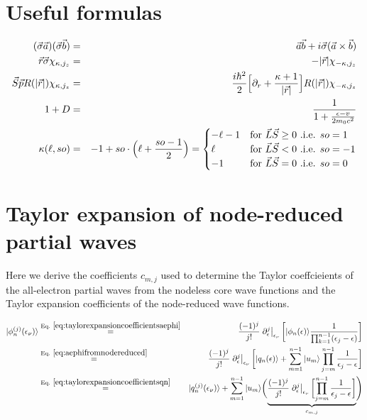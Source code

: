 \documentclass[11pt,a4paper]{report}
\begin{document}
\chapter{Useful formulas}
\begin{eqnarray}
(\vec{\sigma}\vec{a})(\vec{\sigma}\vec{b})
&=&\vec{a}\vec{b}+i\vec{\sigma}(\vec{a}\times\vec{b})
\\
\vec{r}\vec{\sigma}\chi_{\kappa,j_z}&=&-|\vec{r}|\chi_{-\kappa,j_z}
\\
\vec{S}\vec{p}R(|\vec{r}|)\chi_{\kappa,j_z}
&=&\frac{i\hbar^2}{2}\Bigl[\partial_r+\frac{\kappa+1}{|\vec{r}|}\Bigr]
R(|\vec{r}|)\chi_{-\kappa,j_z}
\\
1+D&=&\frac{1}{1+\frac{\epsilon-v}{2m_0c^2}}
\\
\kappa(\ell,so)&=&-1+so\cdot\Bigl(\ell+\frac{so-1}{2}\Bigr)
=
\begin{cases}
-\ell-1&\text{for $\vec{L}\vec{S}\ge0$ .i.e. $so=1$ }\\
\ell&\text{for $\vec{L}\vec{S}<0$ .i.e. $so=-1$}\\
-1&\text{for $\vec{L}\vec{S}=0$ .i.e. $so=0$}\\
\end{cases}
\end{eqnarray}

\chapter{Taylor expansion of node-reduced partial waves}
\label{app:tayloraephi} 
Here we derive the coefficients $c_{m,j}$ used to determine the Taylor
coeffcieients  of the
all-electron partial waves from the nodeless core wave functions and
the Taylor expansion coefficients 
of the node-reduced wave functions.

\begin{eqnarray}
|\phi_n^{(j)}(\epsilon_\nu)\rangle
&\eqrel{eq:taylorexpansioncoefficientsaephi}{=}&
\frac{(-1)^j}{j!}\left.\partial_\epsilon^{j}\right|_{\epsilon_\nu}
\biggl[|\phi_n(\epsilon)\rangle
\frac{1}{\prod_{k=1}^{n-1}(\epsilon_j-\epsilon)}\biggr]
\nonumber\\
&\eqrel{eq:aephifromnodereduced}{=}&
\frac{(-1)^j}{j!}\left.\partial_\epsilon^{j}\right|_{\epsilon_\nu}
\biggl[
|q_n(\epsilon)\rangle
+\sum_{m=1}^{n-1}|u_m\rangle\prod_{j=m}^{n-1}\frac{1}{\epsilon_j-\epsilon}
\biggr]
\nonumber\\
&\eqrel{eq:taylorexpansioncoefficientsqn}{=}&
|q_n^{(j)}(\epsilon_\nu)\rangle
+\sum_{m=1}^{n-1}|u_m\rangle
\biggl(
\underbrace{\frac{(-1)^j}{j!}\left.\partial_\epsilon^{j}\right|_{\epsilon_\nu}
\biggl[\prod_{j=m}^{n-1}\frac{1}{\epsilon_j-\epsilon}
\biggr]}_{c_{m,j}}\Biggr)
\end{eqnarray}
\end{document}
